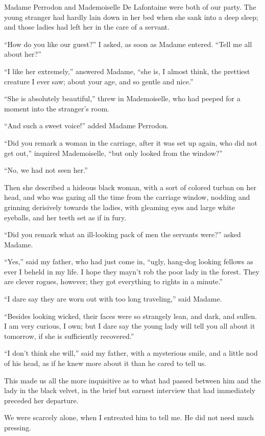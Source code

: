 \documentclass[11pt,twoside,makeidx,hidelinks,]{memoir}
\begin{document}
Madame Perrodon and Mademoiselle De Lafontaine were both of our party.
The young stranger had hardly lain down in her bed when she sank into a
deep sleep; and those ladies had left her in the care of a servant.

``How do you like our guest?'' I asked, as soon as Madame entered. ``Tell
me all about her?''

``I like her extremely,'' answered Madame, ``she is, I almost think, the
prettiest creature I ever saw; about your age, and so gentle and nice.''

``She is absolutely beautiful,'' threw in Mademoiselle, who had peeped for
a moment into the stranger's room.

``And such a sweet voice!'' added Madame Perrodon.

``Did you remark a woman in the carriage, after it was set up again, who
did not get out,'' inquired Mademoiselle, ``but only looked from
the window?''

``No, we had not seen her.''

Then she described a hideous black woman, with a sort of colored turban
on her head, and who was gazing all the time from the carriage window,
nodding and grinning derisively towards the ladies, with gleaming eyes
and large white eyeballs, and her teeth set as if in fury.

``Did you remark what an ill-looking pack of men the servants were?''
asked Madame.

``Yes,'' said my father, who had just come in, ``ugly, hang-dog looking
fellows as ever I beheld in my life. I hope they mayn't rob the poor
lady in the forest. They are clever rogues, however; they got everything
to rights in a minute.''

``I dare say they are worn out with too long traveling,'' said Madame.

``Besides looking wicked, their faces were so strangely lean, and dark,
and sullen. I am very curious, I own; but I dare say the young lady will
tell you all about it tomorrow, if she is sufficiently recovered.''

``I don't think she will,'' said my father, with a mysterious smile, and a
little nod of his head, as if he knew more about it than he cared
to tell us.

This made us all the more inquisitive as to what had passed between him
and the lady in the black velvet, in the brief but earnest interview
that had immediately preceded her departure.

We were scarcely alone, when I entreated him to tell me. He did not need
much pressing.
\end{document}
